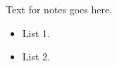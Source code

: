\documentclass[11pt,aspectratio=43,ignorenonframetext,t]{beamer}
\begin{document}

\begin{figure}[!ht]  \end{figure}
Text for notes goes here. 
\begin{itemize}
  \item List 1. 
  \item List 2. 
\end{itemize}


\end{document}
